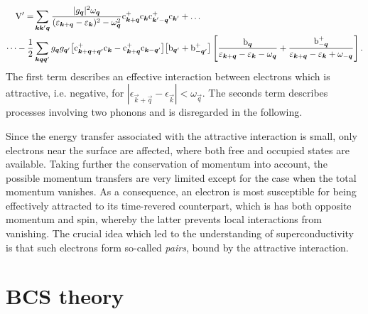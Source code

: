 \begin{align*}
    \mathrm V' = &\sum_{\boldsymbol k \boldsymbol k' \boldsymbol q}
    \frac {|g_{\boldsymbol q}|^2 \omega_{\boldsymbol q}}
    {(\varepsilon_{\boldsymbol k + \boldsymbol q} - \varepsilon_{\boldsymbol k})^2 - \omega_{\boldsymbol q}^2}
    \mathrm c_{\boldsymbol k  + \boldsymbol q}^+ \mathrm c_{\boldsymbol k }
    \mathrm c_{\boldsymbol k' - \boldsymbol q}^+ \mathrm c_{\boldsymbol k'} + \dots
    \\
    \dots - \frac 1 2 &\sum_{\boldsymbol k \boldsymbol q \boldsymbol q'} g_{\boldsymbol q} g_{\boldsymbol q'}
    \big[ \mathrm c_{\boldsymbol k + \boldsymbol q + \boldsymbol q'}^+ \mathrm c_{\boldsymbol k}
    - \mathrm c_{\boldsymbol k + \boldsymbol q}^+ \mathrm c_{\boldsymbol k - \boldsymbol q'} \big]
    \big[ \mathrm b_{\boldsymbol q'} + \mathrm b_{-\boldsymbol q'}^+ \big] \left[
        \frac {\mathrm b_{\boldsymbol q}}
        {\varepsilon_{\boldsymbol k + \boldsymbol q} - \varepsilon_{\boldsymbol k} - \omega_{\boldsymbol q}}
        + \frac {\mathrm b_{-\boldsymbol q}^+}
        {\varepsilon_{\boldsymbol k + \boldsymbol q} - \varepsilon_{\boldsymbol k} + \omega_{-\boldsymbol q}}
    \right].
\end{align*}
%
The first term describes an effective interaction between electrons which is
attractive, i.e. negative, for $|\epsilon_{\vec k + \vec q} - \epsilon_{\vec k}|
< \omega_{\vec q}$. The seconds term describes processes involving two phonons
and is disregarded in the following.

Since the energy transfer associated with the attractive interaction is small,
only electrons near the  surface are affected, where both free and
occupied states are available. Taking further the conservation of momentum into
account, the possible momentum transfers are very limited except for the case
when the total momentum vanishes. As a consequence, an electron is most
susceptible for being effectively attracted to its time-revered counterpart,
which is has both opposite momentum and spin, whereby the latter prevents local
interactions from vanishing. The crucial idea which led to the understanding of
superconductivity is that such electrons form so-called \emph{
pairs}, bound by the attractive interaction.

\section{BCS theory}

